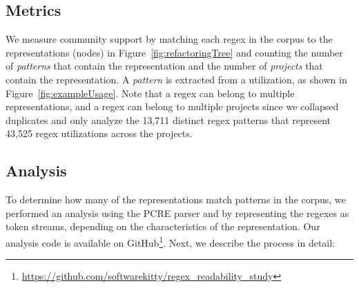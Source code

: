 \subsection{Metrics}
\label{sec:communitymetric}
We measure community support by matching each regex in the corpus to the representations (nodes) in Figure~\ref{fig:refactoringTree} and counting the number of \emph{patterns} that contain the representation and the number of \emph{projects} that contain the representation.
A \emph{pattern} is extracted from a utilization, as shown in Figure~\ref{fig:exampleUsage}.
Note that a regex can belong to multiple representations, and a regex can belong to multiple projects since we collapsed duplicates and only analyze the 13,711 distinct regex patterns that represent 43,525 regex utilizations across the projects.
%
%









\subsection{Analysis}
\label{communityanalysis}
To determine how many of the representations match patterns in the corpus, we performed an analysis using the PCRE parser and by representing the regexes as token streams, depending on the characteristics of the representation. Our analysis code is available on GitHub\footnote{\url{https://github.com/softwarekitty/regex_readability_study}}. Next, we describe the process in detail:

